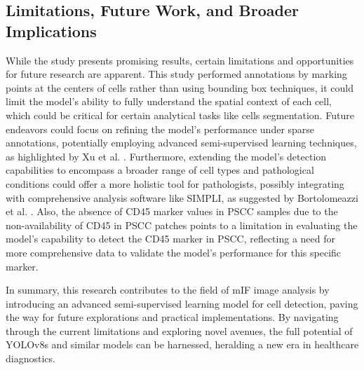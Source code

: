 \documentclass{midl} %
\begin{document}
\subsection{Limitations, Future Work, and Broader Implications}
While the study presents promising results, certain limitations and opportunities for future research are apparent. This study performed annotations by marking points at the centers of cells rather than using bounding box techniques, it could limit the model's ability to fully understand the spatial context of each cell, which could be critical for certain analytical tasks like cells segmentation. Future endeavors could focus on refining the model's performance under sparse annotations, potentially employing advanced semi-supervised learning techniques, as highlighted by Xu et al. \cite{xu2021end}. Furthermore, extending the model's detection capabilities to encompass a broader range of cell types and pathological conditions could offer a more holistic tool for pathologists, possibly integrating with comprehensive analysis software like SIMPLI, as suggested by Bortolomeazzi et al. \cite{bortolomeazzi2022simpli}. Also, the absence of CD45 marker values in PSCC samples due to the non-availability of CD45 in PSCC patches points to a limitation in evaluating the model's capability to detect the CD45 marker in PSCC, reflecting a need for more comprehensive data to validate the model's performance for this specific marker.

In summary, this research contributes to the field of mIF image analysis by introducing an advanced semi-supervised learning model for cell detection, paving the way for future explorations and practical implementations. By navigating through the current limitations and exploring novel avenues, the full potential of YOLOv8s and similar models can be harnessed, heralding a new era in healthcare diagnostics.





\end{document}

